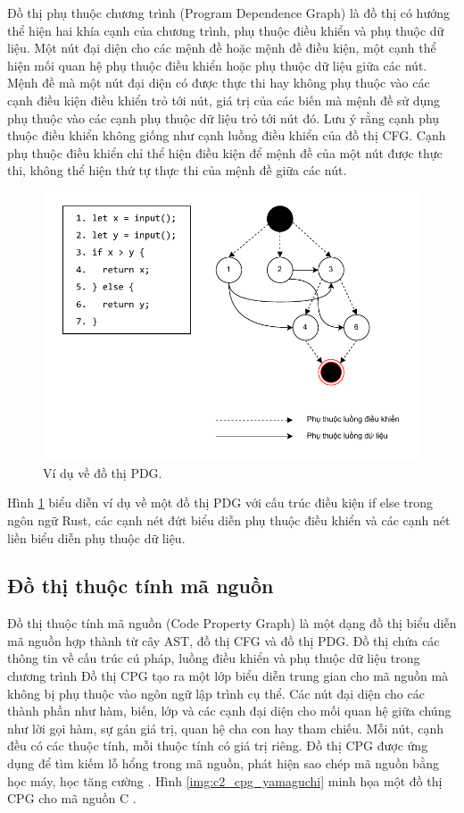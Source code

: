Đồ thị phụ thuộc chương trình (Program Dependence Graph) \cite{ferrante1987program} là đồ thị có hướng thể hiện hai khía cạnh của chương trình, phụ thuộc điều khiển và phụ thuộc dữ liệu.
Một nút đại diện cho các mệnh đề hoặc mệnh đề điều kiện, một cạnh thể hiện mối quan hệ phụ thuộc điều khiển hoặc phụ thuộc dữ liệu giữa các nút.
Mệnh đề mà một nút đại diện có được thực thi hay không phụ thuộc vào các cạnh điều kiện điều khiển trỏ tới nút, giá trị của các biến mà mệnh đề sử dụng phụ thuộc vào các cạnh phụ thuộc dữ liệu trỏ tới nút đó.
Lưu ý rằng cạnh phụ thuộc điều khiển không giống như cạnh luồng điều khiển của đồ thị CFG.
Cạnh phụ thuộc điều khiển chỉ thể hiện điều kiện để mệnh đề của một nút được thực thi, không thể hiện thứ tự thực thi của mệnh đề giữa các nút.

\begin{figure}[H]
  \includegraphics[width=1\columnwidth]{figures/c2/c2_pdg.drawio.pdf}
  \centering
  \caption{Ví dụ về đồ thị PDG.}
  \label{img:c2_pdg}
\end{figure}

Hình \ref{img:c2_pdg} biểu diễn ví dụ về một đồ thị PDG với cấu trúc điều kiện if else trong ngôn ngữ Rust, các cạnh nét đứt biểu diễn phụ thuộc điều khiển và các cạnh nét liền biểu diễn phụ thuộc dữ liệu.

\subsection{Đồ thị thuộc tính mã nguồn}

Đồ thị thuộc tính mã nguồn (Code Property Graph) \cite{yamaguchi2014modeling} là một dạng đồ thị biểu diễn mã nguồn hợp thành từ cây AST, đồ thị CFG và đồ thị PDG.
Đồ thị chứa các thông tin về cấu trúc cú pháp, luồng điều khiển và phụ thuộc dữ liệu trong chương trình
Đồ thị CPG tạo ra một lớp biểu diễn trung gian cho mã nguồn mà không bị phụ thuộc vào ngôn ngữ lập trình cụ thể.
Các nút đại diện cho các thành phần như hàm, biến, lớp và các cạnh đại diện cho mối quan hệ giữa chúng như lời gọi hàm, sự gán giá trị, quan hệ cha con hay tham chiếu.
Mỗi nút, cạnh đều có các thuộc tính, mỗi thuộc tính có giá trị riêng.
Đồ thị CPG được ứng dụng để tìm kiếm lỗ hổng trong mã nguồn, phát hiện sao chép mã nguồn bằng học máy, học tăng cường \cite{zhou2019devign, han2023bjxnet}.
Hình \ref{img:c2_cpg_yamaguchi} minh họa một đồ thị CPG cho mã nguồn C \cite{yamaguchi2014modeling}.

